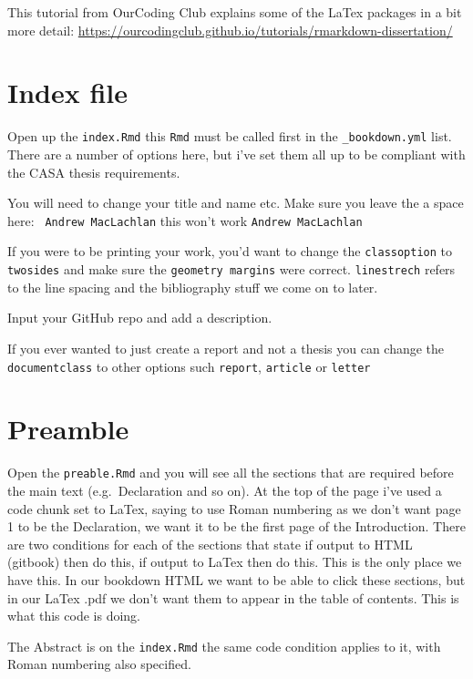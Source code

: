 \documentclass[
  12pt,
  oneside]{book}
\begin{document}
This tutorial from OurCoding Club explains some of the LaTex packages in a bit more detail: \url{https://ourcodingclub.github.io/tutorials/rmarkdown-dissertation/}

\hypertarget{index-file}{%
\section{Index file}\label{index-file}}

Open up the \texttt{index.Rmd} this \texttt{Rmd} must be called first in the \texttt{\_bookdown.yml} list. There are a number of options here, but i've set them all up to be compliant with the CASA thesis requirements.

You will need to change your title and name etc. Make sure you leave the a space here: \texttt{\textbar{}\ Andrew\ MacLachlan} this won't work \texttt{\textbar{}Andrew\ MacLachlan}

If you were to be printing your work, you'd want to change the \texttt{classoption} to \texttt{twosides} and make sure the \texttt{geometry\ margins} were correct. \texttt{linestrech} refers to the line spacing and the bibliography stuff we come on to later.

Input your GitHub repo and add a description.

If you ever wanted to just create a report and not a thesis you can change the \texttt{documentclass} to other options such \texttt{report}, \texttt{article} or \texttt{letter}

\hypertarget{preamble}{%
\section{Preamble}\label{preamble}}

Open the \texttt{preable.Rmd} and you will see all the sections that are required before the main text (e.g.~Declaration and so on). At the top of the page i've used a code chunk set to LaTex, saying to use Roman numbering as we don't want page 1 to be the Declaration, we want it to be the first page of the Introduction. There are two conditions for each of the sections that state if output to HTML (gitbook) then do this, if output to LaTex then do this. This is the only place we have this. In our bookdown HTML we want to be able to click these sections, but in our LaTex .pdf we don't want them to appear in the table of contents. This is what this code is doing.

The Abstract is on the \texttt{index.Rmd} the same code condition applies to it, with Roman numbering also specified.
\end{document}
